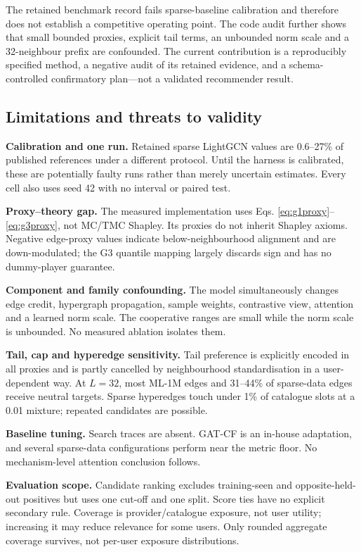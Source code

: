 \documentclass[a4paper,fleqn,longmktitle]{cas-dc}
\begin{document}
The retained benchmark record fails sparse-baseline calibration and therefore
does not establish a competitive operating point. The code audit further shows
that small bounded proxies, explicit tail terms, an unbounded norm scale and a
32-neighbour prefix are confounded. The current contribution is a reproducibly
specified method, a negative audit of its retained evidence, and a
schema-controlled confirmatory plan—not a validated recommender result.

\subsection{Limitations and threats to validity}
\label{sec:limitations}

\textbf{Calibration and one run.} Retained sparse LightGCN values are
0.6--27\% of published references under a different protocol. Until the
harness is calibrated, these are potentially faulty runs rather than merely
uncertain estimates. Every cell also uses seed 42 with no interval or paired
test.

\textbf{Proxy--theory gap.} The measured implementation uses Eqs.
\eqref{eq:g1proxy}--\eqref{eq:g3proxy}, not MC/TMC Shapley. Its proxies do not
inherit Shapley axioms. Negative edge-proxy values indicate below-neighbourhood
alignment and are down-modulated; the G3 quantile mapping largely discards sign
and has no dummy-player guarantee.

\textbf{Component and family confounding.} The model simultaneously changes
edge credit, hypergraph propagation, sample weights, contrastive view,
attention and a learned norm scale. The cooperative ranges are small while the
norm scale is unbounded. No measured ablation isolates them.

\textbf{Tail, cap and hyperedge sensitivity.} Tail preference is explicitly
encoded in all proxies and is partly cancelled by neighbourhood
standardisation in a user-dependent way. At $L=32$, most ML-1M edges and
31--44\% of sparse-data edges receive neutral targets. Sparse hyperedges touch
under 1\% of catalogue slots at a 0.01 mixture; repeated candidates are
possible.

\textbf{Baseline tuning.} Search traces are absent. GAT-CF is an in-house
adaptation, and several sparse-data configurations perform near the metric
floor. No mechanism-level attention conclusion follows.

\textbf{Evaluation scope.} Candidate ranking excludes training-seen and
opposite-held-out positives but uses one cut-off and one split. Score ties have
no explicit secondary rule.
Coverage is provider/catalogue exposure, not user utility; increasing it may
reduce relevance for some users. Only rounded aggregate coverage survives, not
per-user exposure distributions.
\end{document}
